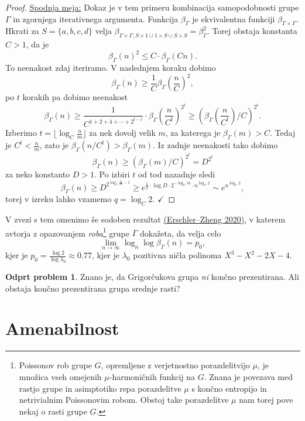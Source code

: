 \documentclass[11pt]{book}
\def\kljuka{$\checkmark$}
\theoremstyle{definition}
\theoremstyle{zgled}
\theoremstyle{odprtproblem}
\newtheorem*{odprtproblem}{Odprt problem}
\theoremstyle{domacanaloga}
\newenvironment{dokaz}
    {\color{siva}\begin{proof}}
    {\end{proof}}
\theoremstyle{izrek}
\begin{document}
\begin{dokaz}
\underline{Spodnja meja:}
Dokaz je v tem primeru kombinacija samopodobnosti grupe $\Gamma$ in zgornjega iterativnega argumenta. Funkcija $\beta_\Gamma$ je ekvivalentna funkciji $\beta_{\Gamma \times \Gamma}$. Hkrati za $S = \{ a,b,c,d \}$ velja $\beta_{\Gamma \times \Gamma, S \times 1 \cup 1 \times S \cup S \times S} = \beta_{\Gamma}^2$. Torej obstaja konstanta $C > 1$, da je
\[
\beta_\Gamma(n)^2 \leq C \cdot \beta_\Gamma(Cn).
\]
To neenakost zdaj iteriramo. V naslednjem koraku dobimo
\[
\beta_\Gamma(n) \geq \frac{1}{C} \beta_\Gamma \left(\frac{n}{C}\right)^2,
\]
po $t$ korakih pa dobimo neenakost
\[
\beta_\Gamma(n) \geq \frac{1}{C^{1 + 2 + 4 + \cdots + 2^{t-1}}} \cdot \beta_\Gamma \left( \frac{n}{C^t} \right)^{2^t} \geq \left( \beta_\Gamma \left( \frac{n}{C^t} \right) / C \right)^{2^t}.
\]
Izberimo $t = \lfloor \log_C \frac{n}{m} \rfloor$ za nek dovolj velik $m$, za katerega je $\beta_\Gamma(m) > C$. Tedaj je $C^t < \frac{n}{m}$, zato je $\beta_\Gamma(n/C^t) > \beta_\Gamma(m)$. Iz zadnje neenakosti tako dobimo
\[
\beta_\Gamma(n) \geq \left( \beta_\Gamma(m)/C \right)^{2^t} = D^{2^t}
\]
za neko konstanto $D > 1$. Po izbiri $t$ od tod nazadnje sledi
\[
\beta_\Gamma(n) \geq D^{2^{\log_C{\frac{n}{m}} - 1}}
\geq e^{\frac12 \cdot \log D \cdot 2^{-\log_C m} \cdot n^{\log_C 2}}
\sim e^{n^{\log_C 2}},
\]
torej v izreku lahko vzamemo $q = \log_C 2$. \kljuka
\end{dokaz}

V zvezi s tem omenimo še sodoben rezultat \href{https://link.springer.com/article/10.1007/s00222-019-00922-0}{(Erschler--Zheng 2020)}, v katerem avtorja z opazovanjem {\em roba}\footnote{Poissonov rob grupe $G$, opremljene z verjetnostno porazdelitvijo $\mu$, je množica vseh omejenih $\mu$-harmoničnih funkcij na $G$. Znana je povezava med rastjo grupe in asimptotiko repa porazdelitve $\mu$ s končno entropijo in netrivialnim Poissonovim robom. Obstoj take porazdelitve $\mu$ nam torej pove nekaj o rasti grupe $G$.} grupe $\Gamma$ dokažeta, da velja celo
\[
\lim_{n \to \infty} \log_n \log \beta_\Gamma(n) = p_0,
\]
kjer je $p_0 = \frac{\log 2}{\log \lambda_0} \approx 0.77$, kjer je $\lambda_0$ pozitivna ničla polinoma $X^3 - X^2 - 2X - 4$.

\begin{odprtproblem}
Znano je, da Grigorčukova grupa {\em ni} končno prezentirana. Ali obstaja končno prezentirana grupa srednje rasti?
\end{odprtproblem}

\section{Amenabilnost}
\end{document}
